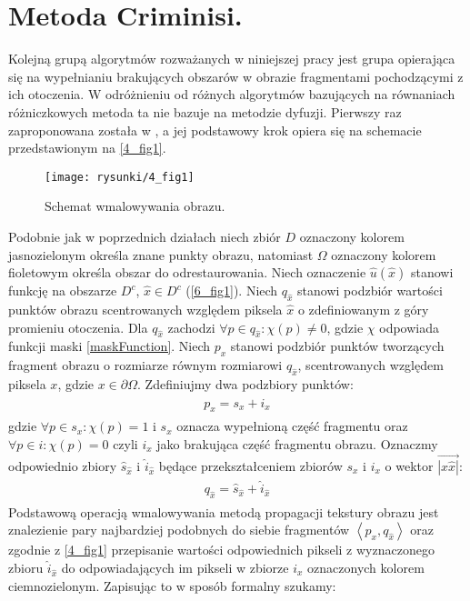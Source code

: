 \documentclass[12pt, twoside, openany]{report}
\theoremstyle{definition}
\begin{document}
\section{Metoda Criminisi.}
Kolejną grupą algorytmów rozważanych w niniejszej pracy jest grupa opierająca się na wypełnianiu brakujących obszarów w obrazie fragmentami pochodzącymi z ich otoczenia. W odróżnieniu od różnych algorytmów bazujących na równaniach różniczkowych metoda ta nie bazuje na metodzie dyfuzji. Pierwszy raz zaproponowana została w \cite{efros1999texture}, a jej podstawowy krok opiera się na schemacie przedstawionym na \autoref{4_fig1}.
\begin{figure}[!h]
	\centering
	\texttt{[image: rysunki/4\_fig1]}
	\caption{Schemat wmalowywania obrazu.}
	\label{4_fig1}
\end{figure}
Podobnie jak w poprzednich działach niech zbiór $D$ oznaczony kolorem jasnozielonym określa znane punkty obrazu, natomiast $\Omega$ oznaczony kolorem fioletowym określa obszar do odrestaurowania.
Niech oznaczenie $\hat{u}(\hat{x})$ stanowi funkcję na obszarze $D^c$, $\hat{x}  \in D^c$ (\autoref{6_fig1}).
Niech $q_{\hat{x}}$ stanowi podzbiór wartości punktów obrazu scentrowanych względem piksela $\hat{x}$ o zdefiniowanym z góry promieniu otoczenia.
Dla $q_{\hat{x}}$ zachodzi $\forall p \in q_{\hat{x}} : \chi(p) \neq 0$, gdzie $\chi$ odpowiada funkcji maski \eqref{maskFunction}.
Niech $p_{x}$ stanowi podzbiór punktów tworzących fragment obrazu o rozmiarze równym rozmiarowi $q_{\hat{x}}$, scentrowanych względem piksela $x$, gdzie $x \in \partial \Omega$.
Zdefiniujmy dwa podzbiory punktów:
\begin{align}
\begin{aligned}
p_{x} = s_x + i_x
\end{aligned}
\end{align}
gdzie $\forall p \in s_x : \chi(p) = 1$ i $s_x$ oznacza wypełnioną część fragmentu oraz $\forall p \in i : \chi(p) = 0$ czyli $i_x$ jako brakująca część fragmentu obrazu.  
Oznaczmy odpowiednio zbiory $\hat{s}_{\hat{x}}$ i $\hat{i}_{\hat{x}}$ będące przekształceniem zbiorów $s_x$ i $i_x$ o wektor $\overrightarrow{|x \hat{x}|}$:
\begin{align}
\begin{aligned}
q_{\hat{x}} = \hat{s}_{\hat{x}} + \hat{i}_{\hat{x}}
\end{aligned}
\end{align}
Podstawową operacją wmalowywania metodą propagacji tekstury obrazu jest znalezienie pary
 najbardziej podobnych do siebie fragmentów $\left\langle p_{x}, q_{\hat{x}} \right\rangle $ oraz zgodnie z \autoref{4_fig1} przepisanie wartości odpowiednich pikseli z wyznaczonego zbioru $\hat{i}_{\hat{x}}$ do odpowiadających im pikseli w zbiorze $i_x$ oznaczonych kolorem ciemnozielonym. Zapisując to w sposób formalny szukamy:
\end{document}
